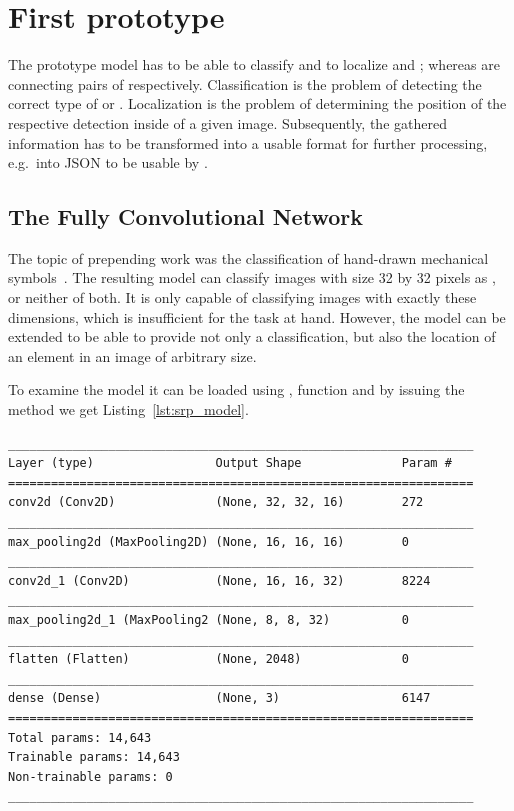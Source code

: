 \section{First prototype}\label{ch:first_prototype}

The prototype model has to be able to classify and to localize  and ; whereas  are connecting pairs of  respectively.
Classification is the problem of detecting the correct type of  or . %
Localization is the problem of determining the position of the respective detection inside of a given image. %
Subsequently, the gathered information has to be transformed into a usable format for further processing, e.g.\ into JSON to be usable by . %

\subsection{The Fully Convolutional Network}\label{ch:fcn}

The topic of prepending work was the classification of hand-drawn mechanical symbols~\cite{Lawrence2020}.
The resulting model can classify images with size 32 by 32 pixels as ,  or neither of both.
It is only capable of classifying images with exactly these dimensions, which is insufficient for the task at hand.
However, the model can be extended to be able to provide not only a classification, but also the location of an element in an image of arbitrary size.

To examine the model it can be loaded using , %
 function and by issuing the  method we get Listing~\ref{lst:srp_model}.

\begin{lstlisting}[caption={Summary of Symbol Classifier.}, label={lst:srp_model}]
_________________________________________________________________
Layer (type)                 Output Shape              Param #
=================================================================
conv2d (Conv2D)              (None, 32, 32, 16)        272
_________________________________________________________________
max_pooling2d (MaxPooling2D) (None, 16, 16, 16)        0
_________________________________________________________________
conv2d_1 (Conv2D)            (None, 16, 16, 32)        8224
_________________________________________________________________
max_pooling2d_1 (MaxPooling2 (None, 8, 8, 32)          0
_________________________________________________________________
flatten (Flatten)            (None, 2048)              0
_________________________________________________________________
dense (Dense)                (None, 3)                 6147
=================================================================
Total params: 14,643
Trainable params: 14,643
Non-trainable params: 0
_________________________________________________________________
\end{lstlisting}

